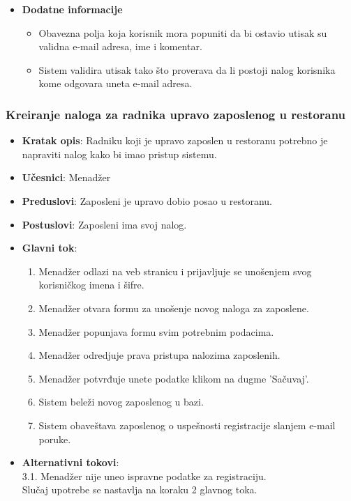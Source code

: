 \begin{itemize} 
     \item \textbf{Dodatne informacije}
 \begin{itemize}
     \item Obavezna polja koja korisnik mora popuniti da bi ostavio utisak su validna e-mail adresa, ime i komentar.
    \item Sistem validira utisak tako što proverava da li postoji nalog korisnika kome odgovara uneta e-mail adresa.
 \end{itemize}
 \end{itemize}
 
 \subsubsection{Kreiranje naloga za radnika upravo zaposlenog u restoranu}
\begin{itemize}
    \item \textbf{Kratak opis}:
   Radniku koji je upravo zaposlen u restoranu potrebno je napraviti nalog kako bi imao pristup sistemu.
    \item \textbf{Učesnici}:
    Menadžer
    \item \textbf{Preduslovi}:
    Zaposleni je upravo dobio posao u restoranu.
    \item \textbf{Postuslovi}:
    Zaposleni ima svoj nalog. 
    \item \textbf{Glavni tok}:
   \begin{enumerate}
        \item Menadžer odlazi na veb stranicu i prijavljuje se unošenjem svog korisničkog imena i šifre.
        \item Menadžer otvara formu za unošenje novog naloga za zaposlene.
        \item Menadžer popunjava formu svim potrebnim podacima.
        \item Menadžer odredjuje prava pristupa nalozima zaposlenih.
        \item Menadžer potvrđuje unete podatke klikom na dugme 'Sačuvaj'.
        \item Sistem beleži novog zaposlenog u bazi.
        \item Sistem obaveštava zaposlenog o uspešnosti registracije slanjem e-mail poruke.
\end{enumerate}
\end{itemize}
\begin {itemize}
\item \textbf {Alternativni tokovi}:\\
 3.1. Menadžer nije uneo ispravne podatke za registraciju.\\
 Slučaj upotrebe se nastavlja na koraku 2 glavnog toka.
 \end{itemize}
